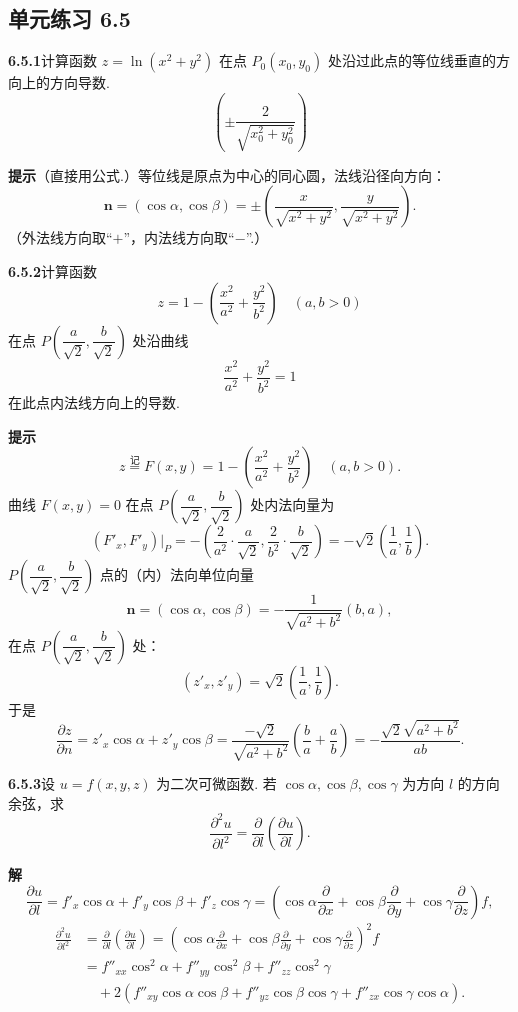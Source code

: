 \documentclass[UTF8, 12pt, fontset=fandol, oneside]{ctexart}
\begin{document}
\subsection*{单元练习 6.5}

\noindent\textbf{6.5.1}\quad 计算函数 $z=\ln(x^2+y^2)$ 在点
$P_0(x_0,y_0)$ 处沿过此点的等位线垂直的方向上的方向导数.
\[
  \left(\pm\frac2{\sqrt{x_0^2+y_0^2}}\right)
\]

\noindent\textbf{提示}\quad （直接用公式.）等位线是原点为中心的同心圆，法线沿径向方向：
\[
  \mathbf n=(\cos\alpha,\cos\beta)
  =
  \pm\left(
  \frac{x}{\sqrt{x^2+y^2}},
  \frac{y}{\sqrt{x^2+y^2}}
  \right).
\]
（外法线方向取“$+$”，内法线方向取“$-$”.）

\noindent\textbf{6.5.2}\quad 计算函数
\[
  z=1-\left(\frac{x^2}{a^2}+\frac{y^2}{b^2}\right)\quad(a,b>0)
\]
在点 $P\left(\dfrac a{\sqrt2},\dfrac b{\sqrt2}\right)$ 处沿曲线
\[
  \frac{x^2}{a^2}+\frac{y^2}{b^2}=1
\]
在此点内法线方向上的导数.

\noindent\textbf{提示}\quad
\[
  z\overset{\text{记}}{=}F(x,y)=1-\left(\frac{x^2}{a^2}+\frac{y^2}{b^2}\right)\quad(a,b>0).
\]
曲线 $F(x,y)=0$ 在点
$P\left(\dfrac a{\sqrt2},\dfrac b{\sqrt2}\right)$ 处内法向量为
\[
  (F'_x,F'_y)\big|_P
  =
  -\left(\frac2{a^2}\cdot\frac a{\sqrt2},
  \frac2{b^2}\cdot\frac b{\sqrt2}\right)
  =
  -\sqrt2\left(\frac1a,\frac1b\right).
\]
$P\left(\dfrac a{\sqrt2},\dfrac b{\sqrt2}\right)$ 点的（内）法向单位向量
\[
  \mathbf n=(\cos\alpha,\cos\beta)
  =
  -\frac1{\sqrt{a^2+b^2}}(b,a),
\]
在点 $P\left(\dfrac a{\sqrt2},\dfrac b{\sqrt2}\right)$ 处：
\[
  (z'_x,z'_y)=\sqrt2\left(\frac1a,\frac1b\right).
\]
于是
\[
  \frac{\partial z}{\partial n}
  =
  z'_x\cos\alpha+z'_y\cos\beta
  =
  \frac{-\sqrt2}{\sqrt{a^2+b^2}}\left(\frac ba+\frac ab\right)
  =
  -\frac{\sqrt2\sqrt{a^2+b^2}}{ab}.
\]

\noindent\textbf{6.5.3}\quad 设 $u=f(x,y,z)$ 为二次可微函数. 若
$\cos\alpha,\cos\beta,\cos\gamma$ 为方向 $l$ 的方向余弦，求
\[
  \frac{\partial^2u}{\partial l^2}
  =
  \frac{\partial}{\partial l}\left(\frac{\partial u}{\partial l}\right).
\]

\noindent\textbf{解}\quad
\[
  \frac{\partial u}{\partial l}
  =
  f'_x\cos\alpha+f'_y\cos\beta+f'_z\cos\gamma
  =
  \left(
  \cos\alpha\frac{\partial}{\partial x}
  +\cos\beta\frac{\partial}{\partial y}
  +\cos\gamma\frac{\partial}{\partial z}
  \right)f,
\]
\[
\begin{aligned}
  \frac{\partial^2u}{\partial l^2}
  &=
  \frac{\partial}{\partial l}\left(\frac{\partial u}{\partial l}\right)
  =
  \left(
  \cos\alpha\frac{\partial}{\partial x}
  +\cos\beta\frac{\partial}{\partial y}
  +\cos\gamma\frac{\partial}{\partial z}
  \right)^2f\\
  &=
  f''_{xx}\cos^2\alpha+f''_{yy}\cos^2\beta+f''_{zz}\cos^2\gamma\\
  &\quad
  +2\left(
  f''_{xy}\cos\alpha\cos\beta+
  f''_{yz}\cos\beta\cos\gamma+
  f''_{zx}\cos\gamma\cos\alpha
  \right).
\end{aligned}
\]
\end{document}
